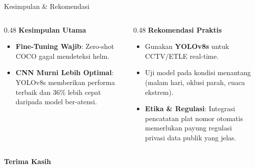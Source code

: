 \documentclass[aspectratio=169,10pt]{beamer}
\begin{document}
\begin{frame}{Kesimpulan \& Rekomendasi}
    \begin{columns}[t]
        \begin{column}{0.48\textwidth}
            \centering
            \large\textbf{\color{success}Kesimpulan Utama}
            \normalsize
            \vspace{0.5em}
            \begin{itemize}
                \item \textbf{Fine-Tuning Wajib}: Zero-shot COCO gagal mendeteksi helm.
                \item \textbf{CNN Murni Lebih Optimal}: YOLOv8s memberikan performa terbaik dan 36\% lebih cepat daripada model ber-atensi.
            \end{itemize}
        \end{column}
        
        \begin{column}{0.48\textwidth}
            \centering
            \large\textbf{\color{secondary}Rekomendasi Praktis}
            \normalsize
            \vspace{0.5em}
            \begin{itemize}
                \item Gunakan \textbf{YOLOv8s} untuk CCTV/ETLE real-time.
                \item Uji model pada kondisi menantang (malam hari, oklusi parah, cuaca ekstrem).
                \item \textbf{Etika \& Regulasi}: Integrasi pencatatan plat nomor otomatis memerlukan payung regulasi privasi data publik yang jelas.
            \end{itemize}
        \end{column}
    \end{columns}
\end{frame}

\begin{frame}{}
\centering
\vspace{2.5cm}
{\Huge\bfseries\color{primary}Terima Kasih}
\end{frame}
\end{document}
